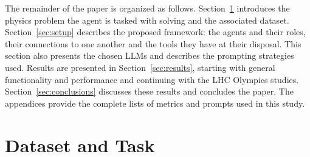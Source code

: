 \documentclass[submission, Phys]{SciPost}
\begin{document}
The remainder of the paper is organized as follows. Section~\ref{sec:dataset_and_task} introduces the physics problem the agent is tasked with solving and the associated dataset. Section~\ref{sec:setup} describes the proposed framework: the agents and their roles, their connections to one another and the tools they have at their disposal. This section also presents the chosen LLMs and describes the prompting strategies used. Results are presented in Section~\ref{sec:results}, starting with general functionality and performance and continuing with the LHC Olympics studies. Section~\ref{sec:conclusions} discusses these results and concludes the paper. The appendices provide the complete lists of metrics and prompts used in this study. 





\section{Dataset and Task}
\label{sec:dataset_and_task}
\end{document}
